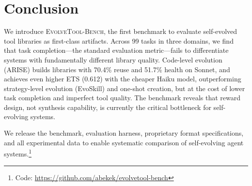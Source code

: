 \documentclass[10pt,twocolumn]{article}
\begin{document}
\section{Conclusion}

We introduce \textsc{EvolveTool-Bench}, the first benchmark to evaluate self-evolved tool libraries as first-class artifacts. Across 99 tasks in three domains, we find that task completion---the standard evaluation metric---fails to differentiate systems with fundamentally different library quality. Code-level evolution (ARISE) builds libraries with 70.4\% reuse and 51.7\% health on Sonnet, and achieves even higher ETS (0.612) with the cheaper Haiku model, outperforming strategy-level evolution (EvoSkill) and one-shot creation, but at the cost of lower task completion and imperfect tool quality. The benchmark reveals that reward design, not synthesis capability, is currently the critical bottleneck for self-evolving systems.

We release the benchmark, evaluation harness, proprietary format specifications, and all experimental data to enable systematic comparison of self-evolving agent systems.\footnote{Code: \url{https://github.com/abekek/evolvetool-bench}}



\end{document}
